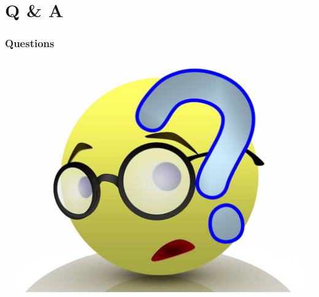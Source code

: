 \documentclass[t]{beamer}
\begin{document}
\section{Q \& A}
\begin{frame}\frametitle{Questions}
\begin{center}
	\includegraphics[scale=0.3]{QandA.jpg}
\end{center}
\end{frame}
\end{document}
